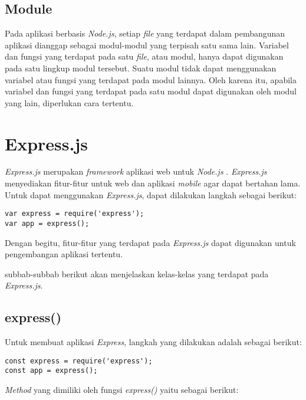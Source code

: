 \subsection{Module}
Pada aplikasi berbasis \textit{Node.js}, setiap \textit{file} yang terdapat dalam pembangunan aplikasi dianggap sebagai modul-modul yang terpisah satu sama lain. Variabel dan fungsi yang terdapat pada satu \textit{file}, atau modul, hanya dapat digunakan pada satu lingkup modul tersebut. Suatu modul tidak dapat menggunakan variabel atau fungsi yang terdapat pada modul lainnya. Oleh karena itu, apabila variabel dan fungsi yang terdapat pada satu modul dapat digunakan oleh modul yang lain, diperlukan cara tertentu.



\section{Express.js}
\label{sec:Express.js}

\textit{Express.js} merupakan \textit{framework} aplikasi web untuk \textit{Node.js} \cite{expressjs}. \textit{Express.js} menyediakan fitur-fitur untuk web dan aplikasi \textit{mobile} agar dapat bertahan lama. Untuk dapat menggunakan \textit{Express.js}, dapat dilakukan langkah sebagai berikut: 
\begin{lstlisting}
var express = require('express');
var app = express();
\end{lstlisting}

Dengan begitu, fitur-fitur yang terdapat pada \textit{Express.js} dapat digunakan untuk pengembangan aplikasi tertentu.

subbab-subbab berikut akan menjelaskan kelas-kelas yang terdapat pada \textit{Express.js}.

\subsection{express()}
Untuk membuat aplikasi \textit{Express}, langkah yang dilakukan adalah sebagai berikut:
\begin{lstlisting}
const express = require('express');
const app = express();
\end{lstlisting}

\textit{Method} yang dimiliki oleh fungsi \textit{express()} yaitu sebagai berikut:


